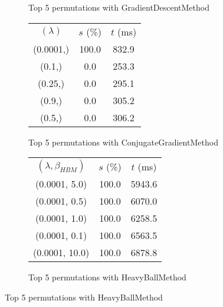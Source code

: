 \begin{figure}[H]
\begin{subfigure}[ht]{.5\textwidth}
\caption{Top 5 permutations with GradientDescentMethod}
\label{subfig:param_comp_MatrixSquareSum_GradientDescentMethod_ConstantSearch}
\end{subfigure}
\hfill
\begin{subfigure}[ht]{.5\textwidth}
\begin{tabular}{|c|c|c|}
\hline
\rowcolor{gray!25}
\multicolumn{3}{|c|}{ConjugateGradientMethod} \\
\hline
\rowcolor{gray!25}
$(\lambda)$ & $s$ (\%) & $t$ (ms) \\
\hline
(0.0001,) & 100.0 & 832.9 \\
(0.1,) & 0.0 & 253.3 \\
(0.25,) & 0.0 & 295.1 \\
(0.9,) & 0.0 & 305.2 \\
(0.5,) & 0.0 & 306.2 \\
\hline
\end{tabular}
\caption{Top 5 permutations with ConjugateGradientMethod}
\label{subfig:param_comp_MatrixSquareSum_ConjugateGradientMethod_ConstantSearch}
\end{subfigure}
\hfill
\begin{subfigure}[ht]{.5\textwidth}
\begin{tabular}{|c|c|c|}
\hline
\rowcolor{gray!25}
\multicolumn{3}{|c|}{HeavyBallMethod} \\
\hline
\rowcolor{gray!25}
$(\lambda,\beta_{HBM})$ & $s$ (\%) & $t$ (ms) \\
\hline
(0.0001, 5.0) & 100.0 & 5943.6 \\
(0.0001, 0.5) & 100.0 & 6070.0 \\
(0.0001, 1.0) & 100.0 & 6258.5 \\
(0.0001, 0.1) & 100.0 & 6563.5 \\
(0.0001, 10.0) & 100.0 & 6878.8 \\
\hline
\end{tabular}
\caption{Top 5 permutations with HeavyBallMethod}
\label{subfig:param_comp_MatrixSquareSum_HeavyBallMethod_ConstantSearch}
\end{subfigure}
\end{figure}

